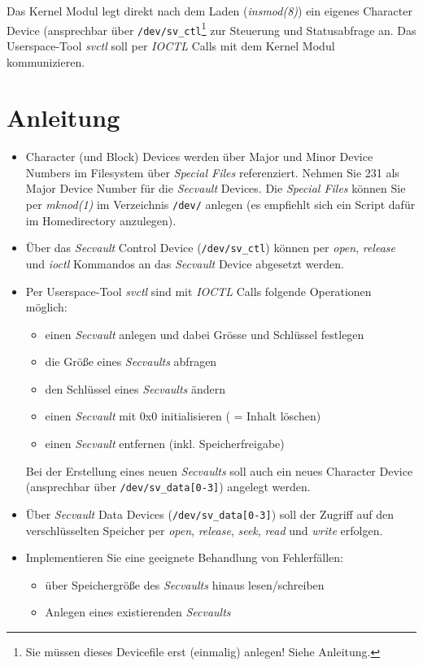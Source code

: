 \documentclass{article}
\begin{document}
Das Kernel Modul legt direkt nach dem Laden (\emph{insmod(8)}) ein
eigenes Character Device (ansprechbar {\"u}ber \verb|/dev/sv_ctl|\footnote{Sie m{\"u}ssen dieses Devicefile erst (einmalig) anlegen! Siehe Anleitung.} zur
Steuerung und Statusabfrage an. Das Userspace-Tool \emph{svctl} soll
per \emph{IOCTL} Calls mit dem Kernel Modul kommunizieren.

\section*{Anleitung}
\begin{itemize}
\item Character (und Block) Devices werden {\"u}ber Major und Minor
  Device Numbers im Filesystem {\"u}ber \emph{Special Files}
  referenziert. Nehmen Sie 231 als Major Device Number f{\"u}r die
  \emph{Secvault} Devices. Die \emph{Special Files} k{\"o}nnen Sie per
  \emph{mknod(1)} im Verzeichnis \verb|/dev/| anlegen (es empfiehlt
  sich ein Script daf{\"u}r im Homedirectory anzulegen).
\item {\"U}ber das \emph{Secvault} Control Device (\verb|/dev/sv_ctl|)
  k{\"o}nnen per \emph{open}, \emph{release} und \emph{ioctl}
  Kommandos an das \emph{Secvault} Device abgesetzt werden.
\item Per Userspace-Tool \emph{svctl} sind mit \emph{IOCTL} Calls
  folgende Operationen m{\"o}glich:
\begin{itemize}
\item einen \emph{Secvault} anlegen und dabei Gr{\"o}sse und Schl{\"u}ssel
  festlegen
\item die Gr{\"o}{\ss}e eines \emph{Secvaults} abfragen
\item den Schl{\"u}ssel eines \emph{Secvaults} {\"a}ndern
\item einen \emph{Secvault} mit 0x0 initialisieren ( = Inhalt l{\"o}schen)
\item einen \emph{Secvault} entfernen (inkl. Speicherfreigabe)
\end{itemize}
Bei der Erstellung eines neuen \emph{Secvaults} soll auch ein neues
Character Device (ansprechbar {\"u}ber \verb|/dev/sv_data[0-3]|)
angelegt werden.
\item {\"U}ber \emph{Secvault} Data Devices (\verb|/dev/sv_data[0-3]|)
  soll der Zugriff auf den verschl{\"u}sselten Speicher per
  \emph{open}, \emph{release}, \emph{seek}, \emph{read} und
  \emph{write} erfolgen.
\item Implementieren Sie eine geeignete Behandlung von
  Fehlerf{\"a}llen:
\begin{itemize}
\item {\"u}ber Speichergr{\"o}{\ss}e des \emph{Secvaults} hinaus
  lesen/schreiben
\item Anlegen eines existierenden \emph{Secvaults}
\end{itemize}
\end{itemize}
\end{document}
